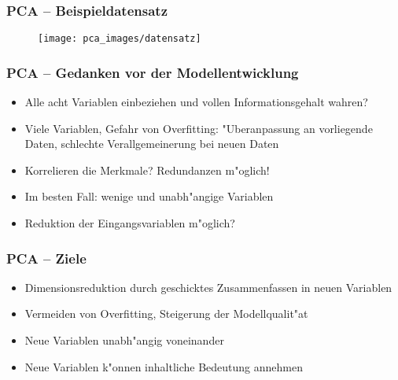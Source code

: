 
\begin{frame}

\frametitle{PCA -- Beispieldatensatz}

\begin{figure}[h]
\centering
\texttt{[image: pca\_images/datensatz]}
\end{figure}

\end{frame}








\begin{frame}

\frametitle{PCA -- Gedanken vor der Modellentwicklung}

\vspace{10pt}

\begin{itemize}
\setlength{\itemsep}{10pt}
\item Alle acht Variablen einbeziehen und vollen Informationsgehalt wahren?
\item Viele Variablen, Gefahr von Overfitting: "Uberanpassung an vorliegende Daten, schlechte Verallgemeinerung bei neuen Daten
\item Korrelieren die Merkmale? Redundanzen m"oglich!
\item Im besten Fall: wenige und unabh"angige Variablen
\item Reduktion der Eingangsvariablen m"oglich?
\end{itemize}

\end{frame}








\begin{frame}

\frametitle{PCA -- Ziele}

\vspace{10pt}

\begin{itemize}
\setlength{\itemsep}{10pt}
\item Dimensionsreduktion durch geschicktes Zusammenfassen in neuen Variablen
\item Vermeiden von Overfitting, Steigerung der Modellqualit"at
\item Neue Variablen unabh"angig voneinander
\item Neue Variablen k"onnen inhaltliche Bedeutung annehmen
\end{itemize}

\end{frame}






